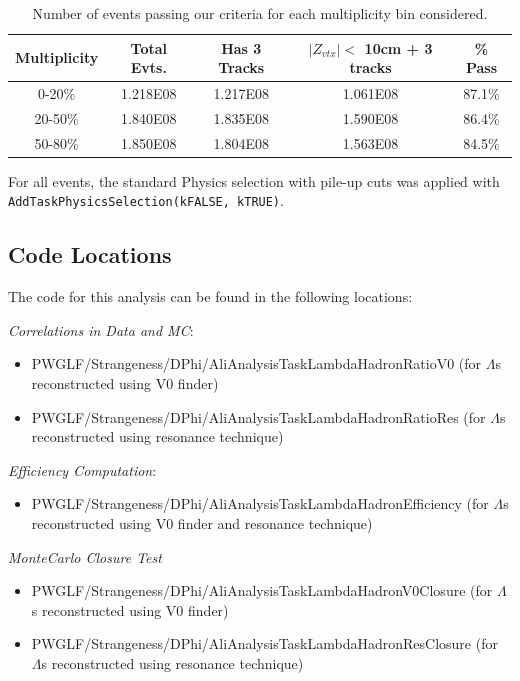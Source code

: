\documentclass[ALICE,manyauthors]{ALICE_analysis_notes}
\begin{document}
\begin{table}[h!]
    \centering
\begin{tabular}{| c | c | c | c || c | }
\hline
Multiplicity & Total Evts. & Has 3 Tracks & $|Z_{vtx}| <$  10cm + 3 tracks & \% Pass \\
\hline
0-20\% & 1.218E08 & 1.217E08 & 1.061E08 & 87.1\%\\
20-50\% & 1.840E08 & 1.835E08 & 1.590E08 & 86.4\%\\
50-80\% & 1.850E08 & 1.804E08 & 1.563E08 & 84.5\%\\
\hline
\end{tabular}
\caption{Number of events passing our criteria for each multiplicity bin considered.}
\label{event_table}
\end{table}

For all events, the standard Physics selection with pile-up cuts was applied with \texttt{AddTaskPhysicsSelection(kFALSE, kTRUE)}.

\subsection{Code Locations}
The code for this analysis can be found in the following locations:

\textit{Correlations in Data and MC}:
\begin{itemize}
\item  PWGLF/Strangeness/DPhi/AliAnalysisTaskLambdaHadronRatioV0 (for $\Lambda$s reconstructed using V0 finder)
\item  PWGLF/Strangeness/DPhi/AliAnalysisTaskLambdaHadronRatioRes (for $\Lambda$s reconstructed using resonance technique)
\end{itemize}

\textit{Efficiency Computation}:
\begin{itemize}
\item  PWGLF/Strangeness/DPhi/AliAnalysisTaskLambdaHadronEfficiency (for $\Lambda$s reconstructed using V0 finder and resonance technique)
\end{itemize}

\textit{MonteCarlo Closure Test}
\begin{itemize}
\item  PWGLF/Strangeness/DPhi/AliAnalysisTaskLambdaHadronV0Closure (for $\Lambda$s reconstructed using V0 finder)
\item  PWGLF/Strangeness/DPhi/AliAnalysisTaskLambdaHadronResClosure (for $\Lambda$s reconstructed using resonance technique)
\end{itemize}
\end{document}
